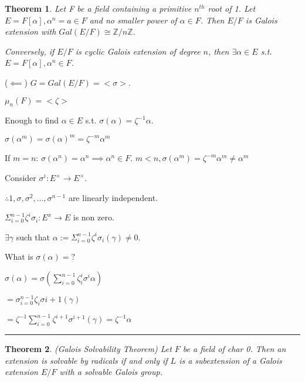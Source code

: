 \documentclass[twoside]{article}
\newcounter{lecnum}
\newcommand{\Z}{\mathbb{Z}}
\newcommand{\z}{\zeta}
\renewcommand{\a}{\alpha}
\newtheorem{theorem}{Theorem}[lecnum]
\newenvironment{proof}{{\bf Proof:}}{\hfill\rule{2mm}{2mm}}
\begin{document}
    \begin{theorem}
        Let F be a field containing a primitive $n^{th}$ root of 1. Let $E = F[\a], \a^n = a \in F$ and no smaller power of $\a \in F$. Then $E/F$ is Galois extension with $Gal(E/F) \cong \Z/n\Z$.
    
        Conversely, if $E/F$ is cyclic Galois extension of degree $n$, then $\exists \alpha \in E$ s.t. $E = F[\a], \a^n \in F$. 
    \end{theorem}

    \begin{proof}
        ($\impliedby$) $G = Gal(E/F) = <\sigma>$.

        $\mu_n(F) = <\z>$

        Enough to find $\alpha \in E$ s.t. $\sigma(\alpha) = \zeta^{-1}\alpha$. 

        $\sigma(\a^m) = \sigma(\a)^m = \z^{-m}\a^m$

        If $m = n$: $\sigma(\a^n) = \a^n \implies \a^n \in F$.  
        $m < n, \sigma(\alpha^m) = \z^{-m}\a^m \neq \a^m$

        Consider $\sigma^i : E^\times \rightarrow E^\times$. 

        $\therefore 1, \sigma, \sigma^2, \dots, \sigma^{n-1}$ are linearly independent. 

        $\Sigma_{i=0}^{n-1} \z^i\sigma_i:E^x \rightarrow E$ is non zero.

        $\exists \gamma$ such that $\alpha := \Sigma_{i=0}^{n-1}\z^i\sigma_i(\gamma) \neq 0$.

        What is $\sigma(\alpha)= ?$

        $\sigma(\alpha) = \sigma(\sum_{i=0}^{n-1} \z_i^i\sigma^i\alpha)$

        $= \sigma_{i=0}^{n-1}\z_i\sigma{i+1}(\gamma)$

        $= \zeta^{-1}\sum_{i=0}^{n-1}\zeta^{i+1}\sigma^{i+1}(\gamma) = \zeta^{-1}\alpha$
    \end{proof}

    \begin{theorem}(Galois Solvability Theorem)
        Let $F$ be a field of char 0. Then an extension is solvable by radicals if and only if $L$ is a subextension of a Galois extension $E/F$ with a solvable Galois group.
    \end{theorem}
\end{document}
